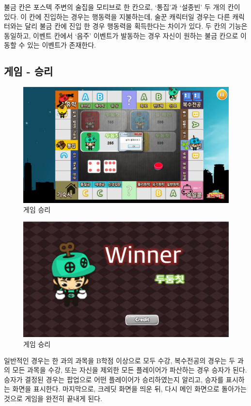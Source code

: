 \documentclass[10pt,oneside,a4paper,titlepage]{article}
\begin{document}
 불금 칸은 포스텍 주변의 술집을 모티브로 한 칸으로, ‘통집’과 ‘설종빈’ 두 개의 칸이 있다. 이 칸에 진입하는 경우는 행동력을 지불하는데, 술꾼 캐릭터일 경우는 다른 캐릭터와는 달리 불금 칸에 진입 한 경우 행동력을 획득한다는 차이가 있다. 두 칸의 기능은 동일하고, 이벤트 칸에서 ‘음주’ 이벤트가 발동하는 경우 자신이 원하는 불금 칸으로 이동할 수 있는 이벤트가 존재한다.
 
\subsection{게임 - 승리}


\begin{figure}[H]
\centering
\centerline{\includegraphics[scale=0.65]{images/11winner}}
\caption{게임 승리}
\end{figure}

\begin{figure}[H]
\centering
\centerline{\includegraphics[scale=0.65]{images/11winner2}}
\caption{게임 승리}
\end{figure}

 일반적인 경우는 한 과의 과목을 B학점 이상으로 모두 수강, 복수전공의 경우는 두 과의 모든 과목을 수강, 또는 자신을 제외한 모든 플레이어가 파산하는 경우 승자가 된다. 승자가 결정된 경우는 팝업으로 어떤 플레이어가 승리하였는지 알리고, 승자를 표시하는 화면을 표시한다. 마지막으로, 크레딧 화면을 띄운 뒤, 다시 메인 화면으로 돌아가는 것으로 게임을 완전히 끝내게 된다.
\end{document}
